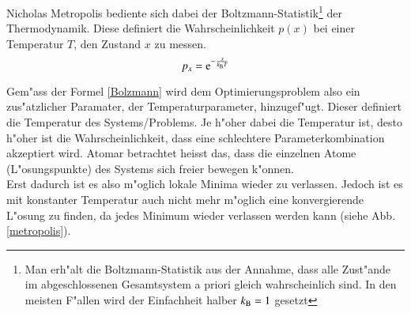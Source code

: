 Nicholas Metropolis bediente sich dabei der Boltzmann-Statistik\footnote{Man erh"alt die Boltzmann-Statistik aus der Annahme, dass alle Zust"ande im abgeschlossenen Gesamtsystem a priori gleich wahrscheinlich sind. In den meisten F"allen wird der Einfachheit halber $k_{\rm B} =1$ gesetzt} der Thermodynamik. Diese definiert die Wahrscheinlichkeit $p(x)$ bei einer Temperatur $T$, den Zustand $x$ zu messen.
\begin{equation}p_x = {\rm e}^{-\frac{x}{k_{\rm B} T}}\label{Bolzmann}\end{equation}

Gem"ass der Formel \ref{Bolzmann} wird dem Optimierungsproblem also ein zus"atzlicher Paramater, der Temperaturparameter, hinzugef"ugt. Dieser definiert die Temperatur des Systems/Problems. Je h"oher dabei die Temperatur ist, desto h"oher ist die Wahrscheinlichkeit, dass eine schlechtere Parameterkombination akzeptiert wird. Atomar betrachtet heisst das, dass die einzelnen Atome (L"osungspunkte) des Systems sich freier bewegen k"onnen.\\
Erst dadurch ist es also m"oglich lokale Minima wieder zu verlassen. Jedoch ist es mit konstanter Temperatur auch nicht mehr m"oglich eine konvergierende L"osung zu finden, da jedes Minimum wieder verlassen werden kann (siehe Abb. \ref{metropolis}).

